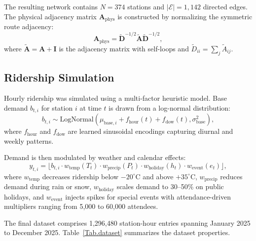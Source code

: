 The resulting network contains $N = 374$ stations and $|\mathcal{E}| = 1,142$ directed edges. The physical adjacency matrix $\mathbf{A}_{\text{phys}}$ is constructed by normalizing the symmetric route adjacency:
\begin{equation}
    \mathbf{A}_{\text{phys}} = \tilde{\mathbf{D}}^{-1/2} \tilde{\mathbf{A}} \tilde{\mathbf{D}}^{-1/2},
    \label{eq:phys_adj}
\end{equation}
where $\tilde{\mathbf{A}} = \mathbf{A} + \mathbf{I}$ is the adjacency matrix with self-loops and $\tilde{D}_{ii} = \sum_j \tilde{A}_{ij}$.

\subsection{Ridership Simulation}

Hourly ridership was simulated using a multi-factor heuristic model. Base demand $b_{t,i}$ for station $i$ at time $t$ is drawn from a log-normal distribution:
\begin{equation}
    b_{t,i} \sim \text{LogNormal}(\mu_{\text{base},i} + f_{\text{hour}}(t) + f_{\text{dow}}(t), \sigma_{\text{base}}^2),
    \label{eq:base_demand}
\end{equation}
where $f_{\text{hour}}$ and $f_{\text{dow}}$ are learned sinusoidal encodings capturing diurnal and weekly patterns.

Demand is then modulated by weather and calendar effects:
\begin{equation}
    y_{t,i} = \big\lfloor b_{t,i} \cdot w_{\text{temp}}(T_t) \cdot w_{\text{precip}}(P_t) \cdot w_{\text{holiday}}(h_t) \cdot w_{\text{event}}(e_t) \big\rfloor,
    \label{eq:demand_modulation}
\end{equation}
where $w_{\text{temp}}$ decreases ridership below $-20^\circ$C and above $+35^\circ$C, $w_{\text{precip}}$ reduces demand during rain or snow, $w_{\text{holiday}}$ scales demand to 30--50\% on public holidays, and $w_{\text{event}}$ injects spikes for special events with attendance-driven multipliers ranging from 5,000 to 60,000 attendees.

The final dataset comprises 1,296,480 station-hour entries spanning January 2025 to December 2025. Table~\ref{Tab.dataset} summarizes the dataset properties.

